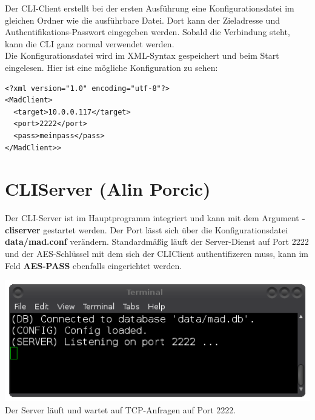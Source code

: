 \documentclass[12pt,a4paper]{report}
\begin{document}
\begin{onehalfspace}
Der CLI-Client erstellt bei der ersten Ausführung eine Konfigurationsdatei im gleichen Ordner wie die ausführbare Datei. Dort kann der Zieladresse und Authentifikations-Passwort eingegeben werden. Sobald die Verbindung steht, kann die CLI ganz normal verwendet werden.\\
Die Konfigurationsdatei wird im XML-Syntax gespeichert und beim Start eingelesen. Hier ist eine mögliche Konfiguration zu sehen:
\begin{lstlisting}
<?xml version="1.0" encoding="utf-8"?>
<MadClient>
  <target>10.0.0.117</target>
  <port>2222</port>
  <pass>meinpass</pass>
</MadClient>>
\end{lstlisting}

\chapter{CLIServer (Alin Porcic)}

Der CLI-Server ist im Hauptprogramm integriert und kann mit dem Argument \textbf{-cliserver} gestartet werden. Der Port lässt sich über die Konfigurationsdatei \textbf{data/mad.conf} verändern. Standardmäßig läuft der Server-Dienst auf Port 2222 und der AES-Schlüssel mit dem sich der CLIClient authentifizeren muss, kann im Feld \textbf{AES-PASS} ebenfalls eingerichtet werden.

\begin{center}
\includegraphics[scale=0.6]{img/cli_server.png}\\
Der Server läuft und wartet auf TCP-Anfragen auf Port 2222.
\end{center}


\end{onehalfspace}
\end{document}
